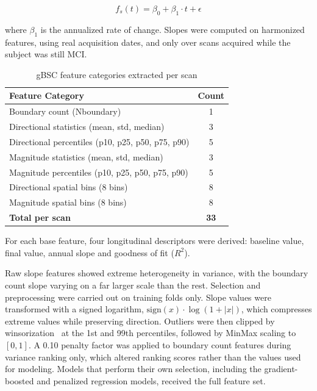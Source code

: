 \documentclass[blue]{ludusofficial}  %
\begin{document}
\begin{equation}
    f_s(t) = \beta_0 + \beta_1 \cdot t + \epsilon
\end{equation}

where $\beta_1$ is the annualized rate of change. Slopes were computed on harmonized features, using real acquisition dates, and only over scans acquired while the subject was still MCI.

\begin{table}[htbp]
\centering
\caption{gBSC feature categories extracted per scan}
\label{tab:bsc-features}
\begin{tabular}{lc}
\hline
\textbf{Feature Category} & \textbf{Count} \\
\hline
Boundary count (Nboundary) & 1 \\
Directional statistics (mean, std, median) & 3 \\
Directional percentiles (p10, p25, p50, p75, p90) & 5 \\
Magnitude statistics (mean, std, median) & 3 \\
Magnitude percentiles (p10, p25, p50, p75, p90) & 5 \\
Directional spatial bins (8 bins) & 8 \\
Magnitude spatial bins (8 bins) & 8 \\
\hline
\textbf{Total per scan} & \textbf{33} \\
\hline
\end{tabular}
\end{table}

For each base feature, four longitudinal descriptors were derived: baseline value, final value, annual slope and goodness of fit ($R^2$).

Raw slope features showed extreme heterogeneity in variance, with the boundary count slope varying on a far larger scale than the rest. Selection and preprocessing were carried out on training folds only. Slope values were transformed with a signed logarithm, $\text{sign}(x) \cdot \log(1 + |x|)$, which compresses extreme values while preserving direction. Outliers were then clipped by winsorization~\cite{tukey1962future} at the 1st and 99th percentiles, followed by MinMax scaling to $[0, 1]$. A 0.10 penalty factor was applied to boundary count features during variance ranking only, which altered ranking scores rather than the values used for modeling. Models that perform their own selection, including the gradient-boosted and penalized regression models, received the full feature set.
\end{document}
